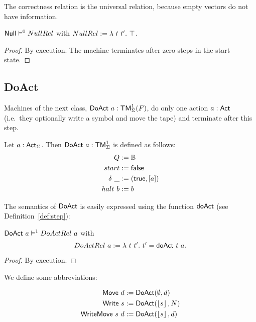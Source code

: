 The correctness relation is the universal relation, because empty vectors do not have information.
\begin{lemma}
  \label{lem:Null_Sem} $\mathsf{Null} \mathrel{\vDash^{0}} NullRel$ with $NullRel := \lambda~t~t'.~ \top$.
\end{lemma}
\begin{proof}
  By execution.  The machine terminates after zero steps in the start state.
\end{proof}

\subsection{DoAct}
\label{sec:DoAct}

Machines of the next class, $\mathsf{DoAct}~a : \mathsf{TM}_\Sigma^1(F)$, do only one action $a:\mathsf{Act}$ (i.e.\ they optionally write a symbol and move the tape) and
terminate after this step.
\begin{definition}[$\MS{DoAct}~a$]
  \label{def:DoAct}
  Let $a:\mathsf{Act}_\Sigma$.  Then $\mathsf{DoAct}~a : \mathsf{TM}_\Sigma^1$ is defined as follows:
  \begin{align*}
    Q          &:= \mathbb{B} \\
    start      &:= \mathsf{false} \\
    \delta ~\_ &:= (\mathsf{true}, \left[ a \right]) \\
    halt   ~ b &:= b
  \end{align*}
\end{definition}
The semantics of $\mathsf{DoAct}$ is easily expressed using the function $\mathsf{doAct}$ (see Definition~\ref{def:step}):
\begin{lemma}
  \label{lem:DoAct_Sem} $\mathsf{DoAct}~a \mathrel{\vDash^{1}} DoActRel~a$ with
  \[
    DoActRel~a := \lambda~t~t'.~ t' = \mathsf{doAct}~t~a.
  \]
\end{lemma}
\begin{proof}
  By execution.
\end{proof}


We define some abbreviations:

\begin{definition}
 \label{def:DoAct-derived} 

 \begin{align*}
   \mathsf{Move}       ~d &:= \mathsf{DoAct} (\emptyset, d) \\
   \mathsf{Write}    ~s   &:= \mathsf{DoAct} (\left\lfloor {s} \right\rfloor, N) \\
   \mathsf{WriteMove}~s~d &:= \mathsf{DoAct} (\left\lfloor {s} \right\rfloor, d)
 \end{align*}
 
\end{definition}



